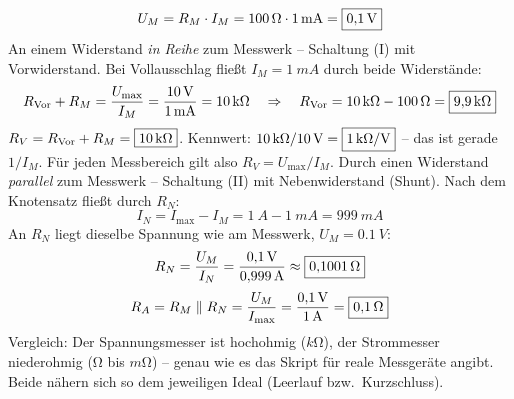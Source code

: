 \documentclass[11pt,a4paper]{article}
\begin{document}
\begin{loesung}
\[
  U_M = R_M\cdot I_M = \SI{100}{\ohm}\cdot\SI{1}{mA} = \boxed{\SI{0.1}{V}}
\]
An einem Widerstand \emph{in Reihe} zum Messwerk -- Schaltung (I) mit Vorwiderstand. Bei Vollausschlag fließt $I_M = \SI{1}{mA}$ durch beide Widerstände:
\[
  R_\text{Vor}+R_M = \frac{U_\text{max}}{I_M} = \frac{\SI{10}{V}}{\SI{1}{mA}} = \SI{10}{k\ohm}
  \quad\Rightarrow\quad R_\text{Vor} = \SI{10}{k\ohm}-\SI{100}{\ohm} = \boxed{\SI{9.9}{k\ohm}}
\]
$R_V = R_\text{Vor}+R_M = \boxed{\SI{10}{k\ohm}}$. Kennwert: $\SI{10}{k\ohm}/\SI{10}{V} = \boxed{\SI{1}{k\ohm/V}}$ -- das ist gerade $1/I_M$. Für jeden Messbereich gilt also $R_V = U_\text{max}/I_M$.
Durch einen Widerstand \emph{parallel} zum Messwerk -- Schaltung (II) mit Nebenwiderstand (Shunt). Nach dem Knotensatz fließt durch $R_N$:
\[
  I_N = I_\text{max}-I_M = \SI{1}{A}-\SI{1}{mA} = \SI{999}{mA}
\]
An $R_N$ liegt dieselbe Spannung wie am Messwerk, $U_M = \SI{0.1}{V}$:
\[
  R_N = \frac{U_M}{I_N} = \frac{\SI{0.1}{V}}{\SI{0.999}{A}} \approx \boxed{\SI{0.1001}{\ohm}}
\]
\[
  R_A = R_M\parallel R_N = \frac{U_M}{I_\text{max}} = \frac{\SI{0.1}{V}}{\SI{1}{A}} = \boxed{\SI{0.1}{\ohm}}
\]
Vergleich: Der Spannungsmesser ist hochohmig ($\si{k\ohm}$), der Strommesser niederohmig ($\si{\ohm}$ bis $\si{m\ohm}$) -- genau wie es das Skript für reale Messgeräte angibt. Beide nähern sich so dem jeweiligen Ideal (Leerlauf bzw.\ Kurzschluss).
\end{loesung}
\end{document}
